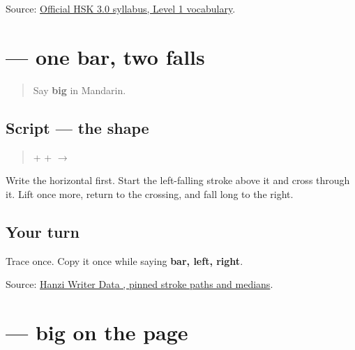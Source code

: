 \begin{tcolorbox}[breakable,colback=teal!4,colframe=teal!35!black,title={Before you move on}]
Source: \href{https://hsk.cn-bj.ufileos.com/3.0/\%E6\%96\%B0\%E7\%89\%88HSK\%E8\%80\%83\%E8\%AF\%95\%E5\%A4\%A7\%E7\%BA\%B21219.pdf}{Official HSK 3.0 syllabus, Level 1 vocabulary}.
\end{tcolorbox}
\section[\texorpdfstring{\zh{大} (dà)}{大 (dà)}]{ — one bar, two falls}

\label{lesson:ZH-W13-da}



\begin{quote}
Say \textbf{big} in Mandarin.
\end{quote}

\subsection*{Script — the shape}

\begin{quote}
\textbf{} + \textbf{} + \textbf{} $\to$ \textbf{}
\end{quote}

Write the horizontal first. Start the left-falling stroke above it and cross through it. Lift once more, return to the crossing, and fall long to the right.

\subsection*{Your turn}
Trace \textbf{} once. Copy it once while saying \textbf{bar, left, right}.

\begin{tcolorbox}[breakable,colback=teal!4,colframe=teal!35!black,title={Before you move on}]
Source: \href{https://raw.githubusercontent.com/chanind/hanzi-writer-data/68d10a4b21150cae5e1ebbd223eed289cf32d90c/data/\%E5\%A4\%A7.json}{Hanzi Writer Data , pinned stroke paths and medians}.
\end{tcolorbox}
\section[\texorpdfstring{\zh{大} (dà)}{大 (dà)}]{ — big on the page}

